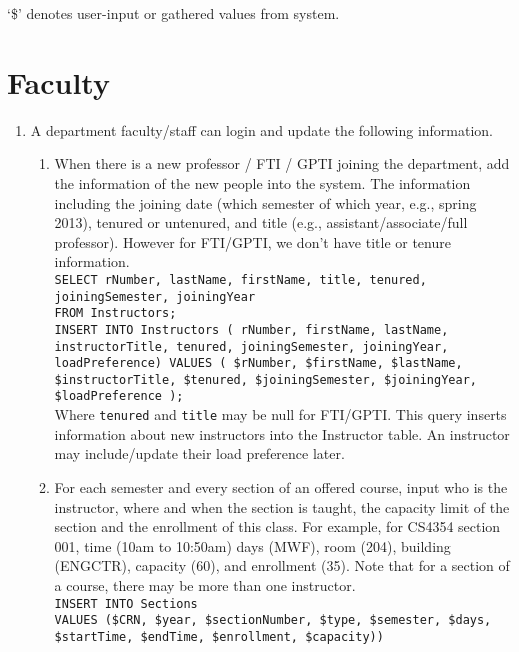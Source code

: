 `\$' denotes user-input or gathered values from system. 

\section{Faculty}
\begin{enumerate}
	\item 	 A department faculty/staff can login and update the following information.
	\begin{enumerate}
		\item	 When there is a new professor / FTI / GPTI joining the department, add the information of the new people into the system. The information including the joining date (which semester of which year, e.g., spring 2013), tenured or untenured, and title (e.g., assistant/associate/full professor). However for FTI/GPTI, we don’t have title or tenure information.\\
		
				\texttt{SELECT rNumber, lastName, firstName, title, tenured, joiningSemester, joiningYear\\ 
						FROM Instructors;}\\
						
				\texttt{INSERT INTO Instructors ( rNumber, firstName, lastName, instructorTitle, tenured, joiningSemester, joiningYear, loadPreference) VALUES ( \$rNumber, \$firstName, \$lastName, \$instructorTitle, \$tenured, \$joiningSemester, \$joiningYear, \$loadPreference );}\\
					
				Where \texttt{tenured} and \texttt{title} may be null for FTI/GPTI.
				This query inserts information about new instructors into the Instructor table. An instructor may include/update their load preference later.  
				

		\item 	 For each semester and every section of an offered course, input who is the instructor, where and when the section is taught, the capacity limit of the section and the enrollment of this class. For example, for CS4354 section 001, time (10am to 10:50am) days (MWF), room (204), building (ENGCTR), capacity (60), and enrollment (35). Note that for a section of a course, there may be more than one
instructor.\\

				\texttt{INSERT INTO Sections\\
						VALUES (\$CRN, \$year, \$sectionNumber, \$type, \$semester, \$days, \$startTime, \$endTime, \$enrollment, \$capacity))}\\


\end{enumerate}
\end{enumerate}
